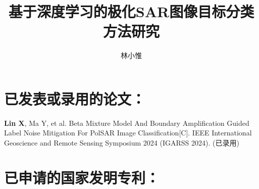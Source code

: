 \documentclass[promaster]{thesis-uestc}
\title{基于深度学习的极化SAR图像目标分类方法研究}{Research on Target Classification Method of Polarimetric SAR Images Based on Deep Learning}
\author{林小惟}{Xiaowei Lin}
\begin{document}
\makecover
\thesisfigurelist %

\originalitydeclaration %





\thesistableofcontents








% 



%
% 
%


%

% 
% 

\begin{thesistheaccomplish}
    \section*{已发表或录用的论文：}
     \textbf{Lin X}, Ma Y, et al. Beta Mixture Model And Boundary Amplification Guided Label Noise Mitigation For PolSAR Image Classification[C]. IEEE International Geoscience and Remote Sensing Symposium 2024 (IGARSS 2024). (已录用)
    \section*{已申请的国家发明专利：}

\end{thesistheaccomplish}
\end{document}
